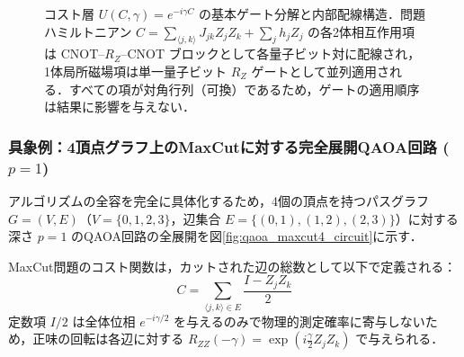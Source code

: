 \documentclass[11pt,a4paper,oneside,openany]{ltjsbook}
\theoremstyle{definition}
\theoremstyle{plain}
\theoremstyle{remark}
\begin{document}
\begin{figure}[htbp]
\caption{コスト層 $U(C, \gamma) = e^{-i \gamma C}$ の基本ゲート分解と内部配線構造．問題ハミルトニアン $C = \sum_{\langle j, k \rangle} J_{jk} Z_j Z_k + \sum_j h_j Z_j$ の各2体相互作用項は CNOT--$R_Z$--CNOT ブロックとして各量子ビット対に配線され，1体局所磁場項は単一量子ビット $R_Z$ ゲートとして並列適用される．すべての項が対角行列（可換）であるため，ゲートの適用順序は結果に影響を与えない．}
\label{fig:cost_layer_internal}
\end{figure}

\subsubsection{具象例：4頂点グラフ上のMaxCutに対する完全展開QAOA回路 ($p=1$)}
アルゴリズムの全容を完全に具体化するため，4個の頂点を持つパスグラフ $G = (V, E)$（$V=\{0, 1, 2, 3\}$，辺集合 $E=\{(0,1), (1,2), (2,3)\}$）に対する深さ $p=1$ のQAOA回路の全展開を図\ref{fig:qaoa_maxcut4_circuit}に示す．

MaxCut問題のコスト関数は，カットされた辺の総数として以下で定義される：
\begin{equation}
    C = \sum_{\langle j, k \rangle \in E} \frac{I - Z_j Z_k}{2}
\end{equation}
定数項 $I/2$ は全体位相 $e^{-i \gamma / 2}$ を与えるのみで物理的測定確率に寄与しないため，正味の回転は各辺に対する $R_{ZZ}(-\gamma) = \exp\left(i \frac{\gamma}{2} Z_j Z_k\right)$ で与えられる．
\end{document}
